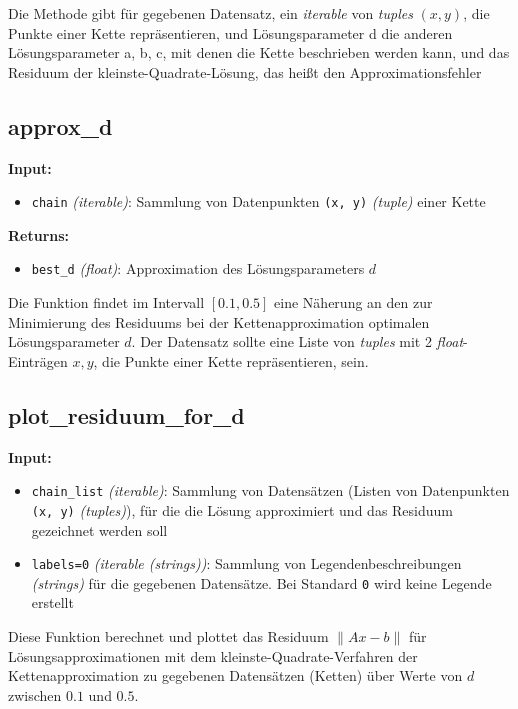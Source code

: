 \documentclass[a4paper, 11pt]{scrartcl}
\begin{document}
\noindent Die Methode gibt für gegebenen Datensatz, ein \textit{iterable} von \textit{tuples} $(x,y)$, die Punkte einer Kette repräsentieren, und Lösungsparameter d die anderen Lösungsparameter a, b, c, mit denen die Kette beschrieben werden kann, und das Residuum der kleinste-Quadrate-Lösung, das heißt den Approximationsfehler



\subsection{approx\_d}

\textbf{Input:}
\begin{itemize}
    \item \texttt{chain} \textit{(iterable)}:
    Sammlung von Datenpunkten \texttt{(x, y)} \textit{(tuple)} einer Kette
\end{itemize}

\noindent \textbf{Returns:}
\begin{itemize}
    \item \texttt{best\_d} \textit{(float)}:
    Approximation des Lösungsparameters $d$
\end{itemize}

\noindent Die Funktion findet im Intervall $[0.1, 0.5]$ eine Näherung an den zur Minimierung des Residuums bei der Kettenapproximation optimalen Lösungsparameter $d.$ Der Datensatz sollte eine Liste von \textit{tuples} mit 2 \textit{float}-Einträgen $x, y$, die Punkte einer Kette repräsentieren, sein.



\subsection{plot\_residuum\_for\_d}

\textbf{Input:}
\begin{itemize}
    \item \texttt{chain\_list} \textit{(iterable)}:
    Sammlung von Datensätzen (Listen von Datenpunkten \texttt{(x, y)} \textit{(tuples)}), für die die Lösung approximiert und das Residuum gezeichnet werden soll
    \item \texttt{labels=0} \textit{(iterable (strings))}:
    Sammlung von Legendenbeschreibungen \textit{(strings)} für die gegebenen Datensätze. Bei Standard \texttt{0} wird keine Legende erstellt
\end{itemize}

\noindent Diese Funktion berechnet und plottet das Residuum $\|Ax - b\|$ für Lösungsapproximationen mit dem kleinste-Quadrate-Verfahren der Kettenapproximation zu gegebenen Datensätzen (Ketten) über Werte von $d$ zwischen $0.1$ und $0.5$.
\end{document}
